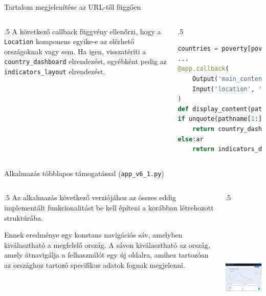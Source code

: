 \documentclass[english, aspectratio=169]{beamer}
\begin{document}
\begin{frame}[fragile]{Tartalom megjelenítése az URL-től függően}
	\begin{columns}
		\begin{column}{.5\textwidth}
			A következő callback függvény ellenőrzi, hogy a \texttt{Location} komponens egyike-e az elérhető országoknak vagy sem. Ha igen, visszatéríti a \texttt{country\_dashboard} elrendezést, egyébként pedig az \texttt{indicators\_layout} elrendezést. 
		\end{column}
		\begin{column}{.5\textwidth}
			\begin{lstlisting}[language=python]
countries = poverty[poverty['is_country']]['Country Name'].drop_duplicates().sort_values().tolist()
...
@app.callback(
	Output('main_content', 'children'),
	Input('location', 'pathname')
)
def display_content(pathname):
if unquote(pathname[1:]) in countries:
	return country_dashboard
else:ar
	return indicators_dashboard
			\end{lstlisting}
		\end{column}
	\end{columns}
\end{frame}

\begin{frame}[fragile]{Alkalmazás többlapos támogatással (\texttt{app\_v6\_1.py})}
	\begin{columns}
		\begin{column}{.5\textwidth}
			Az alkalmazás következő verziójához az összes eddig implementált funkcionalitást be kell építeni a korábban létrehozott struktúrába.\par\smallskip
			Ennek eredménye egy konstans navigációs sáv, amelyben kiválasztható a megfelelő ország. A sávon kiválasztható az ország, amely átnavigálja a felhasználót egy új oldalra, amihez tartozóan az országhoz tartozó specifikus adatok fognak megjelenni.
		\end{column}
		\begin{column}{.5\textwidth}
			\begin{center}
				\includegraphics[width=7cm, height=7cm, keepaspectratio]{images/adv_7.png}
			\end{center}
		\end{column}
	\end{columns}
\end{frame}
\end{document}
